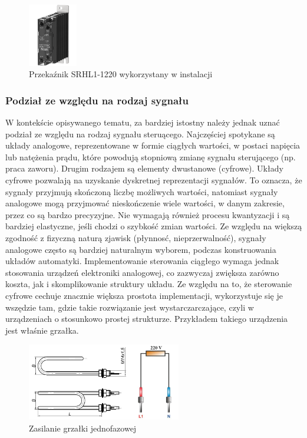 \documentclass[a4paper,twoside,12pt]{book}
\begin{document}
\begin{figure}[h]
	\centering
	\includegraphics[width=0.19\textwidth]{./img/SSR2.png}
	\caption{Przekaźnik SRHL1-1220 wykorzystany w instalacji \cite{autonics}}
	\label{fig:SSR}
\end{figure}

\newpage
\subsubsection{Podział ze względu na rodzaj sygnału}
W kontekście opisywanego tematu, za bardziej istostny należy jednak uznać podział ze względu na rodzaj sygnału steruącego. Najczęściej spotykane są układy analogowe, reprezentowane w formie ciągłych wartości, w postaci napięcia lub natężenia prądu, które powodują stopniową zmianę sygnału sterującego (np. praca zaworu). Drugim rodzajem są elementy dwustanowe (cyfrowe). Układy cyfrowe pozwalają na uzyskanie dyskretnej reprezentacji sygnałów. To oznacza, że sygnały przyjmują skończoną liczbę możliwych wartości, natomiast sygnały analogowe mogą przyjmować nieskończenie wiele wartości, w danym zakresie, przez co są bardzo precyzyjne. Nie wymagają również procesu kwantyzacji i są bardziej elastyczne, jeśli chodzi o szybkość zmian wartości. Ze względu na większą zgodność z fizyczną naturą zjawisk (płynnosć, nieprzerwalność), sygnały analogowe często są bardziej naturalnym wyborem, podczas konstruowania układów automatyki. Implementowanie sterowania ciągłego wymaga jednak stosowania urządzeń elektroniki analogowej, co zazwyczaj zwiększa zarówno koszta, jak i skomplikowanie struktury układu. Ze względu na to, że sterowanie cyfrowe cechuje znacznie większa prostota implementacji, wykorzystuje się je wszędzie tam, gdzie takie rozwiązanie jest wystarczarczające, czyli w urządzeniach o stosunkowo prostej strukturze. Przykładem takiego urządzenia jest właśnie grzałka.

\begin{figure}[h]
	\centering
	\includegraphics[width=0.6\textwidth]{./img/onePhaseHeater.jpg}
	\caption{Zasilanie grzałki jednofazowej \cite{egniazdka, intmax}}
	\label{fig:onePhaseHeater}
\end{figure}
\end{document}
